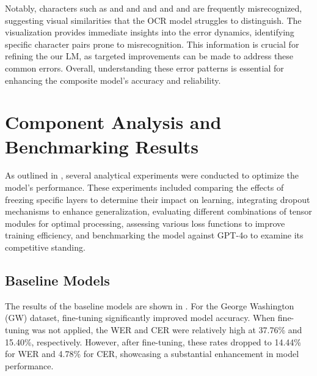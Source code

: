 Notably, characters such as \say{,} and   and   and  and  and  are frequently misrecognized, suggesting visual similarities that the OCR model struggles to distinguish. The visualization provides immediate insights into the error dynamics, identifying specific character pairs prone to misrecognition. This information is crucial for refining the our LM, as targeted improvements can be made to address these common errors. Overall, understanding these error patterns is essential for enhancing the composite model's accuracy and reliability.


\section{Component Analysis and Benchmarking Results}
\label{sec:5_component_analysis_and_benchmarking_results}
As outlined in , several analytical experiments were conducted to optimize the model's performance. These experiments included comparing the effects of freezing specific layers to determine their impact on learning, integrating dropout mechanisms to enhance generalization, evaluating different combinations of tensor modules for optimal processing, assessing various loss functions to improve training efficiency, and benchmarking the model against GPT-4o to examine its competitive standing.

\subsection{Baseline Models}
\label{subsec:5_baseline_models}
The results of the baseline models are shown in . For the George Washington (GW) dataset, fine-tuning significantly improved model accuracy. When fine-tuning was not applied, the WER and CER were relatively high at 37.76\% and 15.40\%, respectively. However, after fine-tuning, these rates dropped to 14.44\% for WER and 4.78\% for CER, showcasing a substantial enhancement in model performance.

